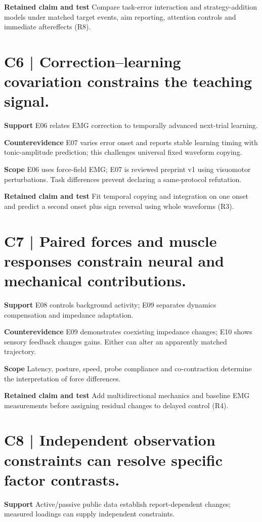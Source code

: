 \documentclass[11pt,a4paper]{article}
\begin{document}
\textbf{Retained claim and test} Compare task-error interaction and strategy-addition models under matched target events, aim reporting, attention controls and immediate aftereffects (R8).\par
\medskip\section{C6 | Correction–learning covariation constrains the teaching signal.}
\textbf{Support} E06 relates EMG correction to temporally advanced next-trial learning.\par
\textbf{Counterevidence} E07 varies error onset and reports stable learning timing with tonic-amplitude prediction; this challenges universal fixed waveform copying.\par
\textbf{Scope} E06 uses force-field EMG; E07 is reviewed preprint v1 using visuomotor perturbations. Task differences prevent declaring a same-protocol refutation.\par
\textbf{Retained claim and test} Fit temporal copying and integration on one onset and predict a second onset plus sign reversal using whole waveforms (R3).\par
\clearpage\section{C7 | Paired forces and muscle responses constrain neural and mechanical contributions.}
\textbf{Support} E08 controls background activity; E09 separates dynamics compensation and impedance adaptation.\par
\textbf{Counterevidence} E09 demonstrates coexisting impedance changes; E10 shows sensory feedback changes gains. Either can alter an apparently matched trajectory.\par
\textbf{Scope} Latency, posture, speed, probe compliance and co-contraction determine the interpretation of force differences.\par
\textbf{Retained claim and test} Add multidirectional mechanics and baseline EMG measurements before assigning residual changes to delayed control (R4).\par
\medskip\section{C8 | Independent observation constraints can resolve specific factor contrasts.}
\textbf{Support} Active/passive public data establish report-dependent changes; measured loadings can supply independent constraints.\par
\end{document}
